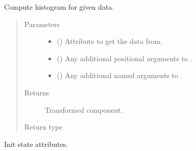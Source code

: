 \documentclass[letterpaper,10pt,english]{sphinxmanual}
\begin{document}
\begin{fulllineitems}
\begin{fulllineitems}
\label{\detokenize{api/rock:geology.src.Rock.histogram}}
Compute histogram for given data.
\begin{quote}\begin{description}
\item[{Parameters}] \leavevmode\begin{itemize}
\item {} 
 (\sphinxstyleliteralemphasis{\sphinxupquote{, }}) \textendash{} Attribute to get the data from.

\item {} 
 () \textendash{} Any additional positional arguments to .

\item {} 
 () \textendash{} Any additional named arguments to .

\end{itemize}

\item[{Returns}] \leavevmode
{} \textendash{} Transformed component.

\item[{Return type}] \leavevmode
{\hyperref[\detokenize{api/base_classes:geology.src.base_spatial.SpatialComponent}]{}}

\end{description}\end{quote}

\end{fulllineitems}


\begin{fulllineitems}
\label{\detokenize{api/rock:geology.src.Rock.init_state}}
Init state attributes.


\end{fulllineitems}
\end{fulllineitems}
\end{document}

